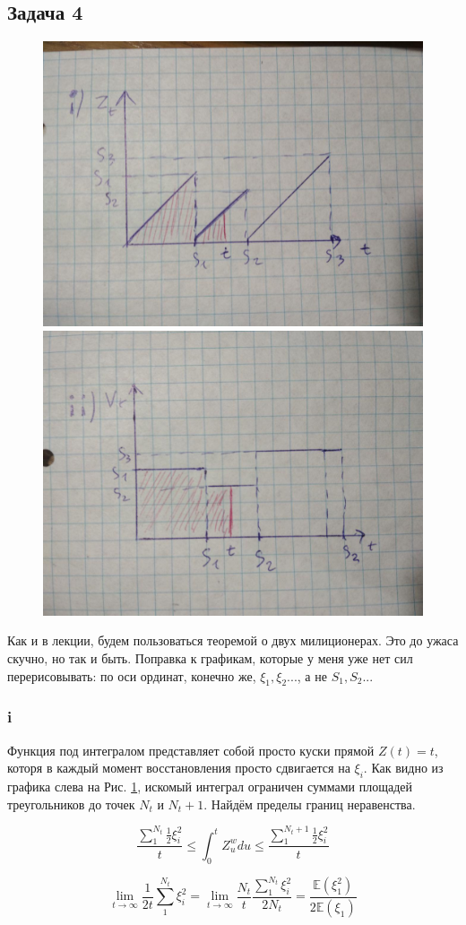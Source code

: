 \documentclass[a4paper,12pt]{article}
\def \mbb{\mathbb}
\def \E{\mbb{E}}
\begin{document}
\subsection{Задача 4}

\begin{figure}[h]
	
	\includegraphics[width = 0.5\linewidth]{21}
	\includegraphics[width = 0.5\linewidth]{22}
	\label{police}
\end{figure}

Как и в лекции, будем пользоваться теоремой о двух милиционерах. Это до ужаса скучно, но так и быть. Поправка к графикам, которые у меня уже нет сил перерисовывать: по оси ординат, конечно же, $ \xi_1, \xi_2 ... $, а не $ S_1, S_2 ... $

\subsubsection{i}

Функция под интегралом представляет собой просто куски прямой $ Z(t) = t $, которя в каждый момент восстановления просто сдвигается на $ \xi_i $.
Как видно из графика слева на Рис. \ref{police}, искомый интеграл ограничен суммами площадей треугольников до точек $ N_t $ и $ N_t+1 $. Найдём пределы границ неравенства.

\[ \frac{\sum_{1}^{N_t}\frac{1}{2}\xi_i^2}{t} \le \int_{0}^{t}Z_u^{w} du\le \frac{\sum_{1}^{N_t + 1}\frac{1}{2}\xi_i^2}{t} \]

\[ \lim\limits_{t \to \infty}\frac{1}{2t} \sum_{1}^{N_t}\xi_i^2 = \lim\limits_{t \to \infty} \frac{N_t}{t}  \frac{\sum_{1}^{N_t}\xi_i^2 }{2 N_t} = \frac{\E(\xi_1^2)}{2 \E(\xi_1)} \]
\end{document}
